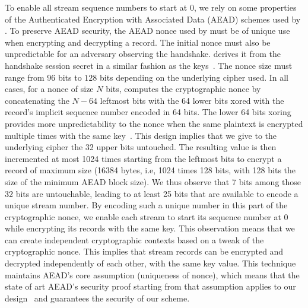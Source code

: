 To enable all stream sequence numbers to start at 0, we rely on some properties
of the Authenticated Encryption with Associated Data (AEAD) schemes used by . To preserve AEAD security, the AEAD nonce used by \tcpls must be of unique
use when encrypting and decrypting a record. The initial nonce must also be
unpredictable for an adversary observing the handshake. \tcpls derives it from
the \tls handshake session secret in a similar fashion as the \tls
keys~\cite{rfc8446}. The nonce size must range from $96$ bits to $128$ bits
depending on the underlying cipher used. In all cases, for a nonce of size $N$
bits, \tls computes the cryptographic nonce by
concatenating the $N-64$ leftmost bits with the 64 lower bits xored with the
record's implicit sequence number encoded in 64 bits. The lower 64 bits xoring
provides more unpredictability to the nonce when the same plaintext is encrypted
multiple times with the same key~\cite{bellare2016multi,hoang2018multi}. This
design implies that we give to the underlying cipher the 32 upper bits
untouched. The resulting value is then incremented at most 1024 times starting
from the leftmost bits to encrypt a \tls record of maximum size (16384 bytes,
i.e, 1024 times 128 bits, with 128 bits the size of the minimum AEAD block
size). We thus observe that 7 bits among those 32 bits are untouchable, leading
to at least 25 bits that are available to encode a unique stream number. By
encoding such a unique number in this part of the cryptographic nonce, we enable
each stream to start its sequence number at 0 while encrypting its records with
the same key. This observation means that we can create independent
cryptographic contexts based on a tweak of the cryptographic nonce. This implies
that stream records can be encrypted and decrypted independently of each other,
with the same key value. This technique maintains AEAD's core assumption
(uniqueness of nonce), which means that the state of art AEAD's security proof
starting from that assumption applies to our
design~\cite{chatterjee2011another} and guarantees the security of our scheme.

